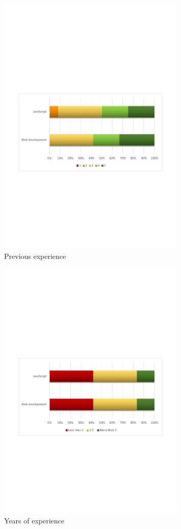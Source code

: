 \begin{figure}[h!]
  \centering
    \includegraphics[width=0.8\textwidth]{images/charts/xp.pdf}
	\caption[Previous experience of participants]{Previous experience}
	\label{fig:xp}
\end{figure}

\begin{figure}[h!]
  \centering
    \includegraphics[trim={0 0 0.1cm 0},clip,width=0.8\textwidth]{images/charts/years_of_xp.pdf}
	\caption[Years of experience]{Years of experience}
	\label{fig:years_of_xp}
\end{figure}

